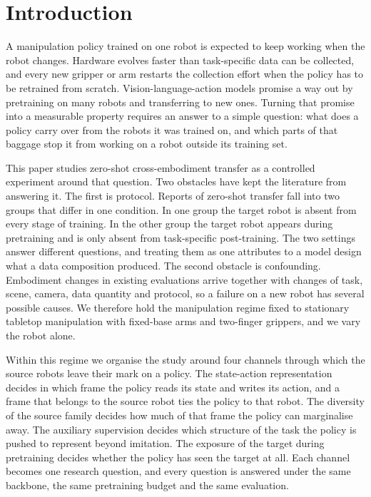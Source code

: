 \section{Introduction}
\label{sec:intro}

A manipulation policy trained on one robot is expected to keep working when the robot changes. Hardware evolves faster than task-specific data can be collected, and every new gripper or arm restarts the collection effort when the policy has to be retrained from scratch. Vision-language-action models promise a way out by pretraining on many robots and transferring to new ones. Turning that promise into a measurable property requires an answer to a simple question: what does a policy carry over from the robots it was trained on, and which parts of that baggage stop it from working on a robot outside its training set.

This paper studies zero-shot cross-embodiment transfer as a controlled experiment around that question. Two obstacles have kept the literature from answering it. The first is protocol. Reports of zero-shot transfer fall into two groups that differ in one condition. In one group the target robot is absent from every stage of training. In the other group the target robot appears during pretraining and is only absent from task-specific post-training. The two settings answer different questions, and treating them as one attributes to a model design what a data composition produced. The second obstacle is confounding. Embodiment changes in existing evaluations arrive together with changes of task, scene, camera, data quantity and protocol, so a failure on a new robot has several possible causes. We therefore hold the manipulation regime fixed to stationary tabletop manipulation with fixed-base arms and two-finger grippers, and we vary the robot alone.

Within this regime we organise the study around four channels through which the source robots leave their mark on a policy. The state-action representation decides in which frame the policy reads its state and writes its action, and a frame that belongs to the source robot ties the policy to that robot. The diversity of the source family decides how much of that frame the policy can marginalise away. The auxiliary supervision decides which structure of the task the policy is pushed to represent beyond imitation. The exposure of the target during pretraining decides whether the policy has seen the target at all. Each channel becomes one research question, and every question is answered under the same backbone, the same pretraining budget and the same evaluation.


